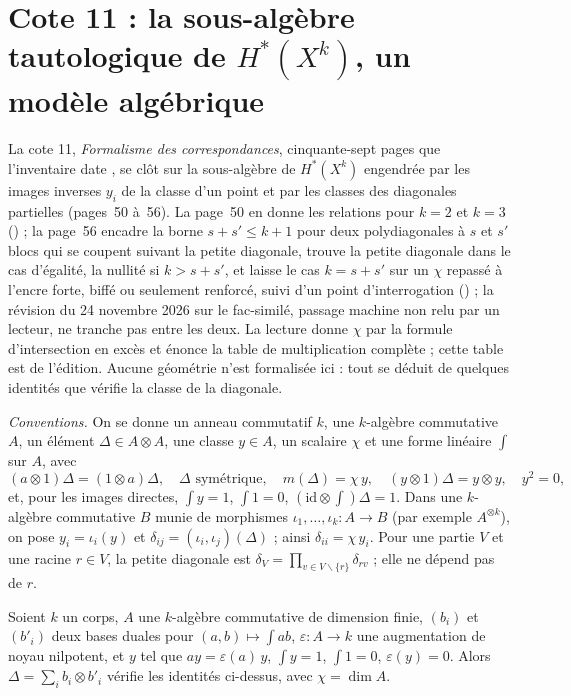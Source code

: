 \section[Cote 11 : la sous-algèbre tautologique des puissances de X, un modèle algébrique]{Cote 11 : la sous-algèbre tautologique de $H^*(X^k)$, un modèle algébrique\protect{}}\label{sec:11}

La cote 11, \emph{Formalisme des correspondances}, cinquante-sept pages que l'inventaire date , se clôt sur la sous-algèbre de $H^*(X^k)$ engendrée par les images inverses $y_i$ de la classe d'un point et par les classes des diagonales partielles (pages~50 à~56). La page~50 en donne les relations pour $k = 2$ et $k = 3$ () ; la page~56 encadre la borne $s + s' \leqslant k + 1$ pour deux polydiagonales à $s$ et $s'$ blocs qui se coupent suivant la petite diagonale, trouve la petite diagonale dans le cas d'égalité, la nullité  si $k > s + s'$, et laisse le cas $k = s + s'$ sur un $\chi$ repassé à l'encre forte, biffé ou seulement renforcé, suivi d'un point d'interrogation () ; la révision du 24 novembre 2026 sur le fac-similé, passage machine non relu par un lecteur, ne tranche pas entre les deux. La lecture donne $\chi$ par la formule d'intersection en excès et énonce la table de multiplication complète ; cette table est de l'édition. Aucune géométrie n'est formalisée ici : tout se déduit de quelques identités que vérifie la classe de la diagonale.

\noindent\emph{Conventions.} On se donne un anneau commutatif $k$, une $k$-algèbre commutative $A$, un élément $\Delta \in A \otimes A$, une classe $y \in A$, un scalaire $\chi$ et une forme linéaire $\int$ sur $A$, avec
\[
(a \otimes 1)\Delta = (1 \otimes a)\Delta, \quad \Delta \text{ symétrique}, \quad m(\Delta) = \chi\, y, \quad (y \otimes 1)\Delta = y \otimes y, \quad y^2 = 0,
\]
et, pour les images directes, $\int y = 1$, $\int 1 = 0$, $(\mathrm{id} \otimes \textstyle\int)\Delta = 1$. Dans une $k$-algèbre commutative $B$ munie de morphismes $\iota_1, \dots, \iota_k : A \to B$ (par exemple $A^{\otimes k}$), on pose $y_i = \iota_i(y)$ et $\delta_{ij} = (\iota_i, \iota_j)(\Delta)$ ; ainsi $\delta_{ii} = \chi\, y_i$. Pour une partie $V$ et une racine $r \in V$, la petite diagonale est $\delta_V = \prod_{v \in V \smallsetminus \{r\}} \delta_{rv}$ ; elle ne dépend pas de $r$.

\begin{enonce}[Le modèle]
Soient $k$ un corps, $A$ une $k$-algèbre commutative de dimension finie, $(b_i)$ et $(b'_i)$ deux bases duales pour $(a, b) \mapsto \int ab$, $\varepsilon : A \to k$ une augmentation de noyau nilpotent, et $y$ tel que $ay = \varepsilon(a)\,y$, $\int y = 1$, $\int 1 = 0$, $\varepsilon(y) = 0$. Alors $\Delta = \sum_i b_i \otimes b'_i$ vérifie les identités ci-dessus, avec $\chi = \dim A$.
\end{enonce}

